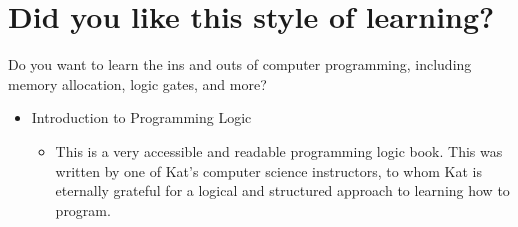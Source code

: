 \documentclass[
]{book}
\providecommand{\tightlist}{%
  \setlength{\itemsep}{0pt}\setlength{\parskip}{0pt}}
\begin{document}
\section{Did you like this style of learning?}\label{did-you-like-this-style-of-learning}

Do you want to learn the ins and outs of computer programming, including memory
allocation, logic gates, and more?

\begin{itemize}
\tightlist
\item
  Introduction to Programming Logic \citep{lynne_ohanlon_introduction_2000}

  \begin{itemize}
  \tightlist
  \item
    This is a very accessible and readable programming logic book. This was written
    by one of Kat's computer science instructors, to whom Kat is eternally grateful
    for a logical and structured approach to learning how to program.
  \end{itemize}
\end{itemize}

  
\end{document}
